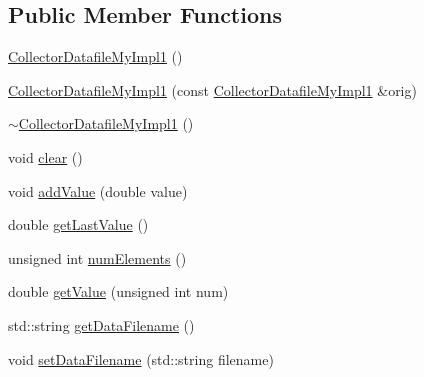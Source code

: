 \subsection*{Public Member Functions}
\begin{DoxyCompactItemize}
\item 
\hyperlink{class_collector_datafile_my_impl1_a88bec096f9b7d707bf436df5b2ab34e1}{Collector\-Datafile\-My\-Impl1} ()
\item 
\hyperlink{class_collector_datafile_my_impl1_a93b68a7b411573a7ff133856f22cbb1f}{Collector\-Datafile\-My\-Impl1} (const \hyperlink{class_collector_datafile_my_impl1}{Collector\-Datafile\-My\-Impl1} \&orig)
\item 
\hyperlink{class_collector_datafile_my_impl1_ac7362a33ec9e82bd3298068cc0c1c6f0}{$\sim$\-Collector\-Datafile\-My\-Impl1} ()
\item 
void \hyperlink{class_collector_datafile_my_impl1_a594004f005db5dd1122946445f4db70d}{clear} ()
\item 
void \hyperlink{class_collector_datafile_my_impl1_aa909fc87f2ee082512616840c9031365}{add\-Value} (double value)
\item 
double \hyperlink{class_collector_datafile_my_impl1_a5a29b2f71a4630c658fb83c047fb1054}{get\-Last\-Value} ()
\item 
unsigned int \hyperlink{class_collector_datafile_my_impl1_a6e20d49a94f677a7483412b8d9689950}{num\-Elements} ()
\item 
double \hyperlink{class_collector_datafile_my_impl1_a55a505d56f9b95a55473bdf1ab24cffe}{get\-Value} (unsigned int num)
\item 
std\-::string \hyperlink{class_collector_datafile_my_impl1_a5ebe8076b9eb9816a1b7d823943102cf}{get\-Data\-Filename} ()
\item 
void \hyperlink{class_collector_datafile_my_impl1_ac4c401ae3cf4ccc723b6b9efa614ccd1}{set\-Data\-Filename} (std\-::string filename)
\end{DoxyCompactItemize}


